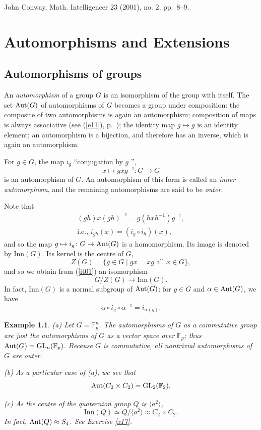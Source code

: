 \documentclass[a4paper,11pt,final,openany]{memoir}%
\newtheorem{example}[X]{Example}
\theoremstyle{nonumberplain}
\begin{document}
{\footnotesize \hfill John Conway, Math. Intelligencer 23 (2001), no. 2,
pp.~8--9.}

\clearpage


\chapter{Automorphisms and Extensions}

\section{Automorphisms of groups}

An \emph{automorphism\/}%
of a group $G$ is an isomorphism of the group with itself. The set $\operatorname{Aut}(G)$
of automorphisms of $G$ becomes a group under composition: the composite of
two automorphisms is again an automorphism; composition of maps is always
associative (see (\ref{e11}), p.~\pageref{e11}); the identity map $g\mapsto g$
is an identity element; an automorphism is a bijection, and therefore has an
inverse, which is again an automorphism.

For $g\in G$, the map $i_{g}$ \textquotedblleft conjugation by $g$%
\textquotedblright,
\[
x\mapsto gxg^{-1}:G\rightarrow G
\]
is an automorphism of $G$. An automorphism of this form is called an
\emph{inner automorphism},%
and the remaining automorphisms are said to be \emph{outer}.%
%


Note that
\begin{align*}
(gh)x(gh)^{-1}=g(hxh^{-1})g^{-1}, \\
\text{i.e., $i_{gh}(x)=(i_{g}\circ
i_{h})(x)$},
\end{align*}
and so the map $g\mapsto i_{g}\colon G\rightarrow\operatorname{Aut}(G)$ is a homomorphism.
Its image is denoted by $\text{Inn}(G)$. Its kernel is the centre of $G$,
\[
Z(G)=\{g\in G\mid gx=xg\text{ all }x\in G\},
\]
and so we obtain from (\ref{it01}) an isomorphism
\[
G/Z(G)\rightarrow\text{Inn}(G).
\]
In fact, $\text{Inn}(G)$ is a normal subgroup of $\operatorname{Aut}(G)$: for $g\in G$ and
$\alpha\in\operatorname{Aut}(G)$, we have
\[
\alpha\circ i_{g}\circ\alpha^{-1}=i_{\alpha(g)}.
\]


\begin{example}
\label{it00a}(a) Let $G=\mathbb{F}_{p}^{n}$. The automorphisms of $G$ as a
commutative group are just the automorphisms of $G$ as a vector space over
$\mathbb{F}_{p}$; thus $\operatorname{Aut}(G)=\operatorname{GL}_{n}(\mathbb{F}_{p})$. Because $G$ is
commutative, all nontrivial automorphisms of $G$ are outer.

(b) As a particular case of (a), we see that
\[
\operatorname{Aut}(C_{2}\times C_{2})=\operatorname{GL}_{2}(\mathbb{F}_{2}).
\]


(c) As the centre of the quaternion group $Q$ is $\langle a^{2}\rangle$,
\[
\text{Inn}(Q)\simeq Q/\langle a^{2}\rangle\approx C_{2}\times C_{2}.
\]
In fact, $\operatorname{Aut}(Q)\approx S_{4}$. See Exercise \ref{x17}.
\end{example}
\end{document}
